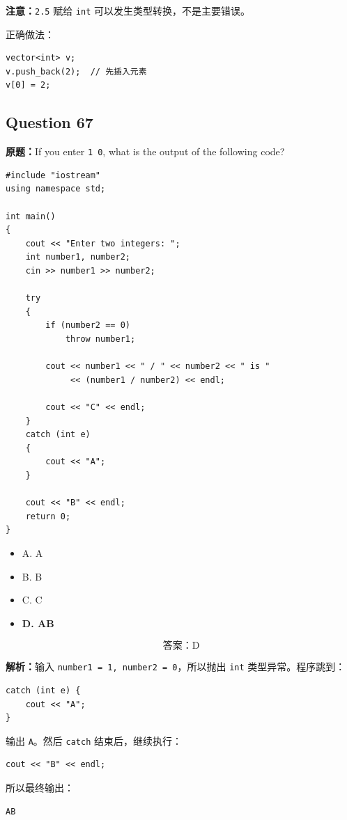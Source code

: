 \documentclass[11pt, a4paper]{article}
\begin{document}
\textbf{注意：}\texttt{2.5} 赋给 \texttt{int} 可以发生类型转换，不是主要错误。

正确做法：
\begin{lstlisting}
vector<int> v;
v.push_back(2);  // 先插入元素
v[0] = 2;
\end{lstlisting}


\subsection*{Question 67}
\textbf{原题：}If you enter \texttt{1 0}, what is the output of the following code?
\begin{lstlisting}
#include "iostream"
using namespace std;

int main()
{
    cout << "Enter two integers: ";
    int number1, number2;
    cin >> number1 >> number2;

    try
    {
        if (number2 == 0)
            throw number1;

        cout << number1 << " / " << number2 << " is "
             << (number1 / number2) << endl;

        cout << "C" << endl;
    }
    catch (int e)
    {
        cout << "A";
    }

    cout << "B" << endl;
    return 0;
}
\end{lstlisting}
\begin{itemize}
    \item A. A
    \item B. B
    \item C. C
    \item \textbf{D. AB}
\end{itemize}

\[
\boxed{\text{答案：D}}
\]

\textbf{解析：}输入 \texttt{number1 = 1, number2 = 0}，所以抛出 \texttt{int} 类型异常。程序跳到：
\begin{lstlisting}
catch (int e) {
    cout << "A";
}
\end{lstlisting}
输出 \texttt{A}。然后 \texttt{catch} 结束后，继续执行：
\begin{lstlisting}
cout << "B" << endl;
\end{lstlisting}
所以最终输出：
\begin{lstlisting}
AB
\end{lstlisting}

\end{document}
